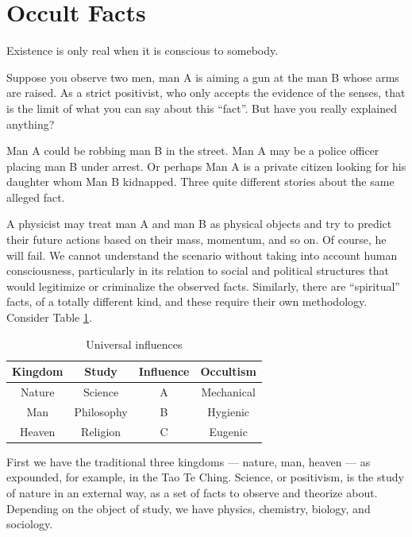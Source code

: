 \section{Occult Facts}

\begin{quotex}
Existence is only real when it is conscious to somebody.
\end{quotex}


Suppose you observe two men, man A is aiming a gun at the man B whose arms are raised. As a strict positivist, who only accepts the evidence of the senses, that is the limit of what you can say about this ``fact''. But have you really explained anything?

Man A could be robbing man B in the street. Man A may be a police officer placing man B under arrest. Or perhaps Man A is a private citizen looking for his daughter whom Man B kidnapped. Three quite different stories about the same alleged fact.

A physicist may treat man A and man B as physical objects and try to predict their future actions based on their mass, momentum, and so on. Of course, he will fail. We cannot understand the scenario without taking into account human consciousness, particularly in its relation to social and political structures that would legitimize or criminalize the observed facts. Similarly, there are ``spiritual'' facts, of a totally different kind, and these require their own methodology. Consider Table \ref{tab:UniversalInfluences}.

\begin{table}[h]\small\centering
\begin{tabular}{cccc}\toprule
\textbf{Kingdom} & \textbf{Study} & \textbf{Influence} & \textbf{Occultism} \\\midrule
Nature & Science & A & Mechanical \\
Man & Philosophy & B & Hygienic \\
Heaven & Religion & C & Eugenic \\\bottomrule
\end{tabular}
\label{tab:UniversalInfluences}
\caption{Universal influences}
\end{table}


First we have the traditional three kingdoms --- nature, man, heaven --- as expounded, for example, in the Tao Te Ching. Science, or positivism, is the study of nature in an external way, as a set of facts to observe and theorize about. Depending on the object of study, we have physics, chemistry, biology, and sociology.

